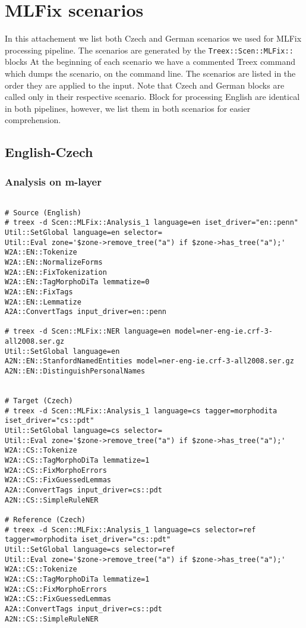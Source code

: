 \chapter{MLFix scenarios}
\label{attach:scen}

In this attachement we list both Czech and German scenarios we used for MLFix processing
pipeline. The scenarios are generated by the \texttt{Treex::Scen::MLFix::} blocks At the beginning
of each scenario we have a commented Treex command which dumps the scenario,
on the command line. The scenarios
are listed in the order they are applied to the input. Note that Czech and German blocks
are called only in their respective scenario. Block for processing English are
identical in both pipelines, however, we list them in both scenarios for easier
comprehension.

\section{English-Czech}

\subsection{Analysis on m-layer}

\lstset{basicstyle=\ttfamily,breaklines=true}
\begin{lstlisting}

# Source (English)
# treex -d Scen::MLFix::Analysis_1 language=en iset_driver="en::penn"
Util::SetGlobal language=en selector=
Util::Eval zone='$zone->remove_tree("a") if $zone->has_tree("a");'
W2A::EN::Tokenize
W2A::EN::NormalizeForms
W2A::EN::FixTokenization
W2A::EN::TagMorphoDiTa lemmatize=0
W2A::EN::FixTags
W2A::EN::Lemmatize
A2A::ConvertTags input_driver=en::penn

# treex -d Scen::MLFix::NER language=en model=ner-eng-ie.crf-3-all2008.ser.gz
Util::SetGlobal language=en
A2N::EN::StanfordNamedEntities model=ner-eng-ie.crf-3-all2008.ser.gz
A2N::EN::DistinguishPersonalNames


# Target (Czech)
# treex -d Scen::MLFix::Analysis_1 language=cs tagger=morphodita iset_driver="cs::pdt"
Util::SetGlobal language=cs selector=
Util::Eval zone='$zone->remove_tree("a") if $zone->has_tree("a");'
W2A::CS::Tokenize
W2A::CS::TagMorphoDiTa lemmatize=1
W2A::CS::FixMorphoErrors
W2A::CS::FixGuessedLemmas
A2A::ConvertTags input_driver=cs::pdt
A2N::CS::SimpleRuleNER

# Reference (Czech)
# treex -d Scen::MLFix::Analysis_1 language=cs selector=ref tagger=morphodita iset_driver="cs::pdt"
Util::SetGlobal language=cs selector=ref
Util::Eval zone='$zone->remove_tree("a") if $zone->has_tree("a");'
W2A::CS::Tokenize
W2A::CS::TagMorphoDiTa lemmatize=1
W2A::CS::FixMorphoErrors
W2A::CS::FixGuessedLemmas
A2A::ConvertTags input_driver=cs::pdt
A2N::CS::SimpleRuleNER

\end{lstlisting}

